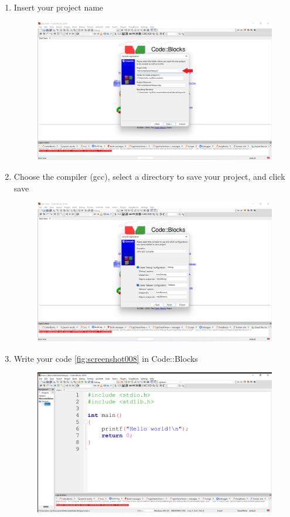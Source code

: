 \begin{enumerate}
\begin{figure}[H]
	\caption{}
	\label{fig:screenshot005}
\end{figure}
\item Insert your project name
\begin{figure}[H]
	\centering
	\includegraphics[width=0.7\linewidth]{../P1/img/screenshot006.png}
	\caption{}
	\label{fig:screenshot006}
\end{figure}
\item Choose the compiler (gcc), select a directory to save your project, and click save
\begin{figure}[H]
	\centering
	\includegraphics[width=0.7\linewidth]{../P1/img/screenshot007.png}
	\caption{}
	\label{fig:screenshot007}
\end{figure}
\item Write your code \ref{fig:screenshot008} in Code::Blocks 
\begin{figure}[H]
	\centering
	\includegraphics[width=0.7\linewidth]{../P1/img/screenshot008.png}

\end{figure}
\end{enumerate}
